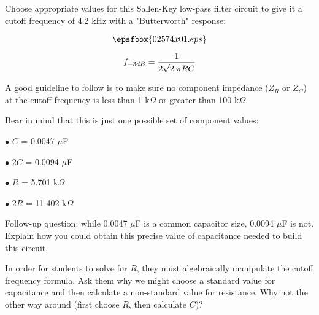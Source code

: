 

Choose appropriate values for this Sallen-Key low-pass filter circuit to give it a cutoff frequency of 4.2 kHz with a "Butterworth" response:

$$\epsfbox{02574x01.eps}$$

$$f_{-3dB} = {1 \over {2 \sqrt{2} \> \pi R C}}$$

A good guideline to follow is to make sure no component impedance ($Z_R$ or $Z_C$) at the cutoff frequency is less than 1 k$\Omega$ or greater than 100 k$\Omega$.







Bear in mind that this is just one possible set of component values:

\medskip
\item{$\bullet$} $C$ = 0.0047 $\mu$F
\item{$\bullet$} $2C$ = 0.0094 $\mu$F
\item{$\bullet$} $R$ = 5.701 k$\Omega$
\item{$\bullet$} $2R$ = 11.402 k$\Omega$
\medskip

\vskip 10pt

Follow-up question: while 0.0047 $\mu$F is a common capacitor size, 0.0094 $\mu$F is not.  Explain how you could obtain this precise value of capacitance needed to build this circuit.







In order for students to solve for $R$, they must algebraically manipulate the cutoff frequency formula.  Ask them why we might choose a standard value for capacitance and then calculate a non-standard value for resistance.  Why not the other way around (first choose $R$, then calculate $C$)?




